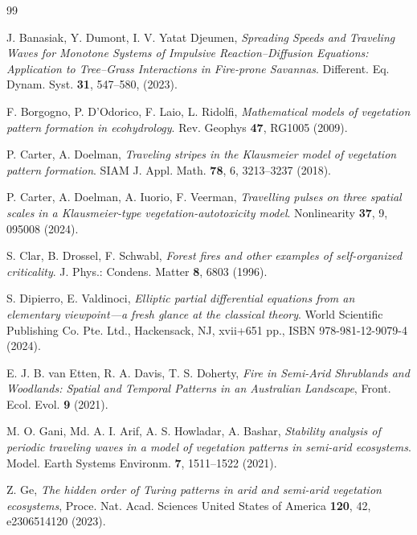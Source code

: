 \documentclass[12pt]{amsart}
\numberwithin{equation}{section}
\begin{document}
\begin{thebibliography}{99} 

J. Banasiak, Y. Dumont, I. V. Yatat Djeumen, {\em
Spreading Speeds and Traveling Waves for Monotone Systems of Impulsive Reaction–Diffusion Equations: Application to Tree–Grass Interactions in Fire-prone Savannas}.
Different. Eq. Dynam. Syst.
{\bf 31}, 547--580, (2023).

F. Borgogno, P. D'Odorico, F. Laio, L. Ridolfi, {\em Mathematical models of vegetation pattern formation in ecohydrology}. Rev. Geophys {\bf
47}, RG1005 (2009).

P. Carter, A. Doelman, {\em
Traveling stripes in the Klausmeier model of vegetation pattern formation}.
SIAM J. Appl. Math. {\bf 78}, 6, 3213--3237 (2018).

P. Carter, A. Doelman, A. Iuorio, F. Veerman, {\em
Travelling pulses on three spatial scales in a Klausmeier-type vegetation-autotoxicity model}.
Nonlinearity {\bf 37}, 9, 095008 (2024).

 S. Clar, B. Drossel, F. Schwabl, {\em
Forest fires and other examples of self-organized criticality}. J. Phys.: Condens. Matter {\bf 8}, 6803 (1996).


S. Dipierro, E. Valdinoci, {\em Elliptic partial differential equations from an elementary viewpoint---a fresh glance at the classical theory}. World Scientific Publishing Co. Pte. Ltd., Hackensack, NJ, xvii+651 pp., ISBN 978-981-12-9079-4 (2024).

E. J. B. van Etten, R. A. Davis, T. S. Doherty,
{\em Fire in Semi-Arid Shrublands and Woodlands: Spatial and Temporal Patterns in an Australian Landscape},
Front. Ecol. Evol. {\bf 9} (2021).

M. O. Gani, Md. A. I. Arif, A. S. Howladar, A. Bashar,
{\em Stability analysis of periodic traveling waves in a model of vegetation patterns in semi-arid ecosystems}.
Model. Earth Systems Environm. {\bf 7}, 1511--1522 (2021).

 Z. Ge, {\em The hidden order of Turing patterns in arid and semi-arid vegetation ecosystems},
Proce. Nat. Acad. Sciences United States of America
{\bf 120}, 42, e2306514120 (2023).


\end{thebibliography}
\end{document}
